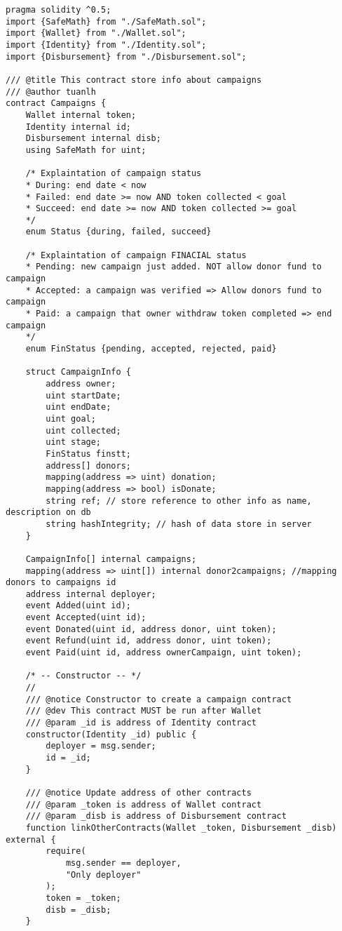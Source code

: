 \documentclass[../main-report.tex]{subfiles}
\begin{document}
\begin{lstlisting}
pragma solidity ^0.5;
import {SafeMath} from "./SafeMath.sol";
import {Wallet} from "./Wallet.sol";
import {Identity} from "./Identity.sol";
import {Disbursement} from "./Disbursement.sol";

/// @title This contract store info about campaigns
/// @author tuanlh
contract Campaigns {
    Wallet internal token;
    Identity internal id;
    Disbursement internal disb;
    using SafeMath for uint;

    /* Explaintation of campaign status
    * During: end date < now
    * Failed: end date >= now AND token collected < goal
    * Succeed: end date >= now AND token collected >= goal
    */
    enum Status {during, failed, succeed}

    /* Explaintation of campaign FINACIAL status
    * Pending: new campaign just added. NOT allow donor fund to campaign
    * Accepted: a campaign was verified => Allow donors fund to campaign
    * Paid: a campaign that owner withdraw token completed => end campaign
    */
    enum FinStatus {pending, accepted, rejected, paid}

    struct CampaignInfo {
        address owner;
        uint startDate;
        uint endDate;
        uint goal;
        uint collected;
        uint stage;
        FinStatus finstt;
        address[] donors;
        mapping(address => uint) donation;
        mapping(address => bool) isDonate;
        string ref; // store reference to other info as name, description on db
        string hashIntegrity; // hash of data store in server
    }

    CampaignInfo[] internal campaigns;
    mapping(address => uint[]) internal donor2campaigns; //mapping donors to campaigns id
    address internal deployer;
    event Added(uint id);
    event Accepted(uint id);
    event Donated(uint id, address donor, uint token);
    event Refund(uint id, address donor, uint token);
    event Paid(uint id, address ownerCampaign, uint token);

    /* -- Constructor -- */
    //
    /// @notice Constructor to create a campaign contract
    /// @dev This contract MUST be run after Wallet
    /// @param _id is address of Identity contract
    constructor(Identity _id) public {
        deployer = msg.sender;
        id = _id;
    }

    /// @notice Update address of other contracts
    /// @param _token is address of Wallet contract
    /// @param _disb is address of Disbursement contract
    function linkOtherContracts(Wallet _token, Disbursement _disb) external {
        require(
            msg.sender == deployer,
            "Only deployer"
        );
        token = _token;
        disb = _disb;
    }


\end{lstlisting}
\end{document}
